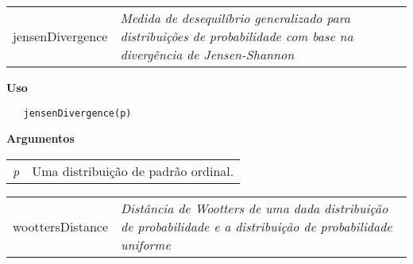 \documentclass[12pt,letterpaper]{article}
\begin{document}
\hrulefill   

\begin{table}[!h]
\begin{center}
\begin{tabularx}{\textwidth}{ X X}
\hspace{0.5cm} jensenDivergence & \textit{Medida de desequilíbrio generalizado para distribuições de probabilidade com base na divergência de Jensen-Shannon}\\
\end{tabularx}
\end{center}
\end{table} 

\vspace{-0.5cm}

\hrulefill  

\vspace{0.5cm}

\textbf{Uso}

\begin{lstlisting}
   jensenDivergence(p)
\end{lstlisting}

\vspace{0.5cm}

\textbf{Argumentos}

\begin{table}[!h]
\begin{center}
\begin{tabularx}{\textwidth}{X X}
\hspace{0.5cm} \textit{p} & Uma distribuição de padrão ordinal.\\
\end{tabularx}
\end{center}
\end{table} 

\newpage

\hrulefill   

\begin{table}[!h]
\begin{center}
\begin{tabularx}{\textwidth}{ X X}
\hspace{0.5cm} woottersDistance & \textit{Distância de Wootters de uma dada distribuição de probabilidade e a distribuição de probabilidade uniforme}\\
\end{tabularx}
\end{center}
\end{table} 
\end{document}
